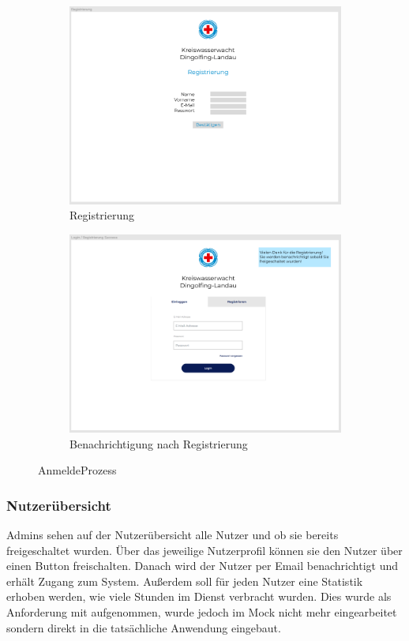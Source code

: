 \documentclass[fontsize=12pt,openright,oneside,paper=a4,BCOR=1cm]{scrbook}
\begin{document}
\begin{figure}[H]
  \centering
  \begin{subfigure}[b]{0.4\linewidth}
    \includegraphics[width=\linewidth]{Anlagen/Figma/2-Registrierung.png}
    \caption{Registrierung}
  \end{subfigure}
  \begin{subfigure}[b]{0.4\linewidth}
    \includegraphics[width=\linewidth]{Anlagen/Figma/3-LoginSuccess.png}
    \caption{Benachrichtigung nach Registrierung}
  \end{subfigure}
  \caption{AnmeldeProzess}
  \label{fig:anmeldeprozess}
\end{figure}

\subsubsection{Nutzerübersicht}
Admins sehen auf der Nutzerübersicht alle Nutzer und ob sie bereits freigeschaltet wurden. Über das jeweilige Nutzerprofil können sie den Nutzer über einen Button freischalten. Danach wird der Nutzer per Email benachrichtigt und erhält Zugang zum System. Außerdem soll für jeden Nutzer eine Statistik erhoben werden, wie viele Stunden im Dienst verbracht wurden. Dies wurde als Anforderung mit aufgenommen, wurde jedoch im Mock nicht mehr eingearbeitet sondern direkt in die tatsächliche Anwendung eingebaut.
\end{document}
